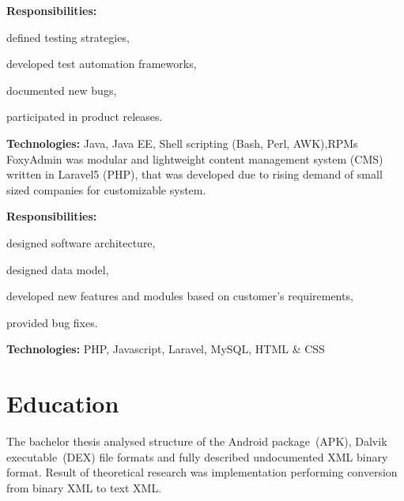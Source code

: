 \documentclass[a4paper]{deedy-resume}
\begin{document}
\vspace{4pt}
\textbf{Responsibilities:}
\begin{tightitemize}
    \item defined testing strategies,
    \item developed test automation frameworks,
    \item documented new bugs,
    \item participated in product releases.
\end{tightitemize}
\vspace{\topsep}
\footnotesize\textbf{Technologies:} Java, Java EE, Shell scripting (Bash, Perl, AWK),RPMs
\normalsize
\sectionspace
\newline
FoxyAdmin was modular and lightweight content management system (CMS) written in Laravel5 (PHP), that was developed due to rising demand of small sized companies for customizable system.

\vspace{4pt}
\textbf{Responsibilities:}
\begin{tightitemize}
    \item designed software architecture,
    \item designed data model,
    \item developed new features and modules based on customer's requirements,
    \item provided bug fixes.
\end{tightitemize}
\vspace{\topsep}
\footnotesize\textbf{Technologies:} PHP, Javascript, Laravel, MySQL, HTML \& CSS
\normalsize
\vspace{5pt}
\section{Education}
\vspace{\topsep}
\vspace{\topsep}
The bachelor thesis analysed structure of the Android package~(APK), Dalvik executable~(DEX) file formats and fully described undocumented XML binary format.
Result of theoretical research was implementation performing conversion from binary XML to text XML.
\end{document}
